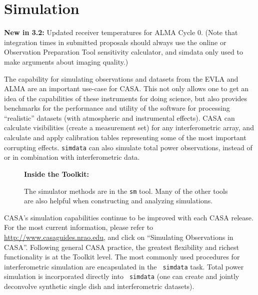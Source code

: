 
\chapter[Simulation]{Simulation}
\label{chapter:sim}

{\bfseries New in 3.2:} Updated receiver temperatures for ALMA Cycle 0. (Note
that integration times in submitted proposals should always use the
online or Observation Preparation Tool sensitivity calculator, and
simdata only used to make arguments about imaging quality.)

The capability for simulating observations and datasets from the EVLA
and ALMA are an important use-case for CASA.  This not only allows one
to get an idea of the capabilities of these instruments for doing
science, but also provides benchmarks for the performance and utility
of the software for processing ``realistic'' datasets (with
atmospheric and instrumental effects).  CASA can calculate
visibilities (create a measurement set) for any interferometric array,
and calculate and apply calibration tables representing some of the
most important corrupting effects. {\tt simdata} can also simulate total power observations, instead of or in
combination with interferometric data.


\begin{wrapfigure}{r}{2.5in}
 \begin{boxedminipage}{2.5in}
    \centerline{\bf Inside the Toolkit:}
    The simulator methods are in the {\tt sm} tool.
    Many of the other tools are also helpful when
    constructing and analyzing simulations.
 \end{boxedminipage}
\end{wrapfigure}

CASA's simulation capabilities continue to be improved with each CASA release.
For the most current information, please refer to
\url{http://www.casaguides.nrao.edu}, and click on ``Simulating
Observations in CASA''.
%
Following general CASA practice, the greatest flexibility and richest
functionality is at the Toolkit level.  The most commonly used
procedures for interferometric simulation are encapsulated in the {\tt
simdata} task.  Total power simulation is 
incorporated directly into {\tt
simdata} (one can create and jointly deconvolve synthetic single dish
and interferometric datasets).

